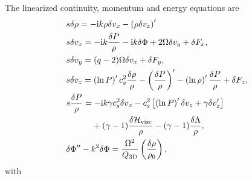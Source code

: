 The linearized continuity, momentum and energy equations are
\begin{align}
   &s \delta \rho = - \ii k \rho\delta v_x -
  \left(\rho\delta v_z\right)^\prime \label{lin_mass} \\ 
   &s  \delta v_x = - \ii k\frac{\delta P}{\rho} - \ii k \delta 
  \Phi + 2\Omega \delta v_y + \delta F_x,\\
   &s \delta v_y = (q-2)\Omega\delta v_x + \delta F_y,\\
  &s \delta v_z =
  \left(\ln{P}\right)^\prime c_s^2\frac{\delta\rho}{\rho} -
  \left(\frac{\delta P}{\rho}\right)^\prime -
  \left(\ln{\rho}\right)^\prime\frac{\delta P}{\rho} + \delta F_z, \\ 
  &s \frac{\delta P}{\rho} = 
 - \ii k \gamma c_s^2\delta v_x
- c_s^2\left[
 \left(\ln{P}\right)^\prime\delta v_z + 
  \gamma\delta v_z^\prime\right] \notag\\
   & \phantom{s \frac{\delta P}{\rho}=}
  + (\gamma-1)\frac{\delta\mathcal{H}_\mathrm{visc}}{\rho} 
  -(\gamma-1)\frac{\delta\Lambda}{\rho}
  \label{lin_energy},\\
  &\delta\Phi^{\prime\prime} - k^2\delta\Phi =
  \frac{\Omega^2}{Q_\mathrm{3D}}\left(\frac{\delta\rho}{\rho_0}\right)\label{lin_gravity},  
\end{align}
with
